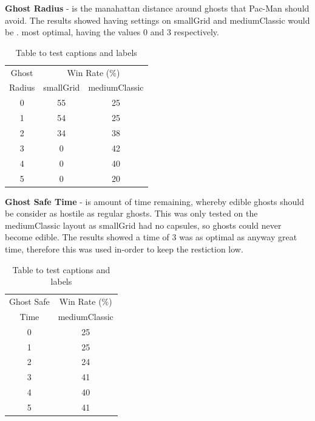 \documentclass[letterpaper, 11pt, journal, final]{IEEEtran}
\begin{document}
\textbf{Ghost Radius} - is the manahattan distance around ghosts that Pac-Man should avoid. The results showed having settings on smallGrid and mediumClassic would be . most optimal, having the values 0 and 3 respectively.

\begin{table}[h!]
\centering
\caption{Table to test captions and labels}
\begin{tabular}{c || c| c} 
 \hline
Ghost & \multicolumn{2}{c}{Win Rate (\%)}\\
\cline{2-3}
Radius & smallGrid & mediumClassic\\
 \hline
 0 & \cellcolor{blue!18}55 & 25\\ [0.5ex]
 1 & 54 & 25\\ [0.5ex]
 2 & 34 & 38\\ [0.5ex]
 3 & 0 & \cellcolor{blue!18}42\\ [0.5ex]
 4 & 0 & 40\\ [0.5ex]
 5 & 0 & 20\\ [0.5ex]
 \hline 
\end{tabular}
\end{table}

\textbf{Ghost Safe Time} - is amount of time remaining, whereby edible ghosts should be consider as hostile as regular ghosts. This was only tested on the mediumClassic layout as smallGrid had no capsules, so ghosts could never become edible. The results showed a time of 3 was as optimal as anyway great time, therefore this was used in-order to keep the restiction low.

\begin{table}[h!]
\centering
\caption{Table to test captions and labels}
\begin{tabular}{c || c} 
 \hline
Ghost Safe & {Win Rate (\%)}\\
\cline{2-2}
Time & mediumClassic\\
 \hline
 0 & 25 \\ [0.5ex]
 1 & 25 \\ [0.5ex]
 2 & 24 \\ [0.5ex]
 \cellcolor{blue!18}3 & \cellcolor{blue!18}41 \\ [0.5ex]
 4 & 40 \\ [0.5ex]
 5 & 41 \\ [0.5ex]
 \hline
\end{tabular}
\end{table}
\end{document}
